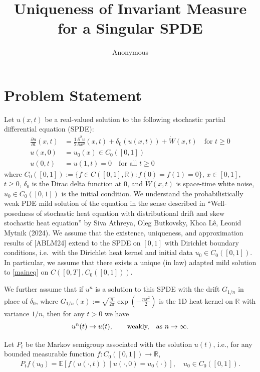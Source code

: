 \documentclass[12pt]{article}
\title{Uniqueness of Invariant Measure for a Singular SPDE}
\author{Anonymous}
\date{}
\newcommand{\R}{\mathbb{R}}
\begin{document}
\maketitle

\section*{Problem Statement}

Let $u(x,t)$ be a real-valued solution to the following stochastic partial differential equation (SPDE):
\begin{align}\tag{$*$}\label{maineq}
    \frac{\partial u}{\partial t}(x,t) &= \frac{1}{2} \frac{\partial^2 u}{\partial x^2}(x,t) + \delta_0(u(x,t)) +  \dot{W}(x,t) \quad\text{for }t \geq 0\\
    u(x,0) &= u_0(x)\in C_0([0,1])\nonumber\\
    u(0,t) &= u(1,t)=0\quad\text{for all }t\geq0    \nonumber
\end{align}
where $C_0([0,1]):=\{f\in C([0,1],\R): f(0)=f(1)=0\}$, $x \in [0,1]$, $t \geq 0$, $\delta_0$ is the Dirac delta function at $0$, and $\dot{W}(x,t)$ is space-time white noise, $u_0\in C_0([0,1])$ is the initial condition. We understand the probabilistically weak PDE mild solution of the equation in the sense described in ``Well-posedness of stochastic heat equation with distributional drift and skew stochastic heat equation'' by Siva Athreya, Oleg Butkovsky, Khoa L\^{e}, Leonid Mytnik (2024). 
We assume that the existence, uniqueness, and approximation results of [ABLM24] extend to the SPDE on $[0,1]$ with Dirichlet boundary conditions, i.e.\ with the Dirichlet heat kernel and initial data $u_0\in C_0([0,1])$. In particular, we assume that there exists a unique (in law) adapted mild solution to \eqref{maineq} on $C([0,T],C_0([0,1]))$.

We further assume that if $u^n$ is a solution to this SPDE with the drift $G_{1/n}$ in place of $\delta_0$, where $G_{1/n}(x):=\sqrt{\frac{n}{2\pi}} \exp(-\frac{n x^2}{2})$ is the 1D heat kernel on $\mathbb{R}$ with variance $1/n$, then for any $t>0$ we have 
\begin{equation*}
u^n(t)\to u(t),\qquad\text{weakly, \,\, as $n\to\infty$}.
\end{equation*}

Let $P_t$ be the Markov semigroup associated with the solution $u(t)$, i.e., for any bounded measurable function $f\colon C_0([0,1])\to\R$,
\begin{align}
    P_t f(u_0) = \mathbb{E}[f(u(\cdot,t)) \mid u(\cdot,0) = u_0(\cdot)],\quad u_0\in C_0([0,1]).
\end{align}
\end{document}
